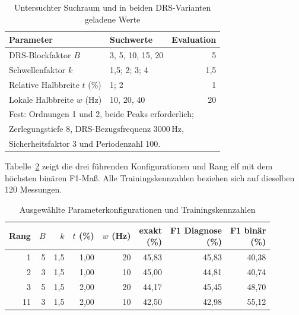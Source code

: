 \begin{table}[H]
  \centering
  \caption{Untersuchter Suchraum und in beiden DRS-Varianten geladene Werte}
  \label{tab:ergebnisse_suchumfang}
  \label{tab:ergebnisse_vergleichsparameter}
  \small
  \begin{tabular}{llr}
    \hline
    \textbf{Parameter} & \textbf{Suchwerte} & \textbf{Evaluation} \\
    \hline
    DRS-Blockfaktor $B$ & 3, 5, 10, 15, 20 & 5 \\
    Schwellenfaktor $k$ & 1,5; 2; 3; 4 & 1,5 \\
    Relative Halbbreite $t$ (\%) & 1; 2 & 1 \\
    Lokale Halbbreite $w$ (Hz) & 10, 20, 40 & 20 \\
    \hline
    \multicolumn{3}{l}{Fest: Ordnungen 1 und 2, beide Peaks erforderlich;} \\
    \multicolumn{3}{l}{Zerlegungstiefe 8, DRS-Bezugsfrequenz 3000\,Hz,} \\
    \multicolumn{3}{l}{Sicherheitsfaktor 3 und Periodenzahl 100.} \\
    \hline
  \end{tabular}
\end{table}

Tabelle~\ref{tab:ergebnisse_rangliste} zeigt die drei führenden
Konfigurationen und Rang elf mit dem höchsten binären F1-Maß.
Alle Trainingskennzahlen beziehen sich auf dieselben 120 Messungen.

\begin{table}[H]
  \centering
  \caption{Ausgewählte Parameterkonfigurationen und Trainingskennzahlen}
  \label{tab:ergebnisse_rangliste}
  \small
  \setlength{\tabcolsep}{4pt}
  \begin{tabular}{rrrrrrrr}
    \hline
    Rang & $B$ & $k$ & $t$ (\%) & $w$ (Hz) &
      \shortstack{exakt\\(\%)} & \shortstack{F1 Diagnose\\(\%)} &
      \shortstack{F1 binär\\(\%)} \\
    \hline
    1 & 5 & 1,5 & 1,00 & 20 & 45,83 & 45,83 & 40,38 \\
    2 & 3 & 1,5 & 1,00 & 10 & 45,00 & 44,81 & 40,74 \\
    3 & 5 & 1,5 & 2,00 & 20 & 44,17 & 45,45 & 48,70 \\
    11 & 3 & 1,5 & 2,00 & 10 & 42,50 & 42,98 & 55,12 \\
    \hline
  \end{tabular}
\end{table}

